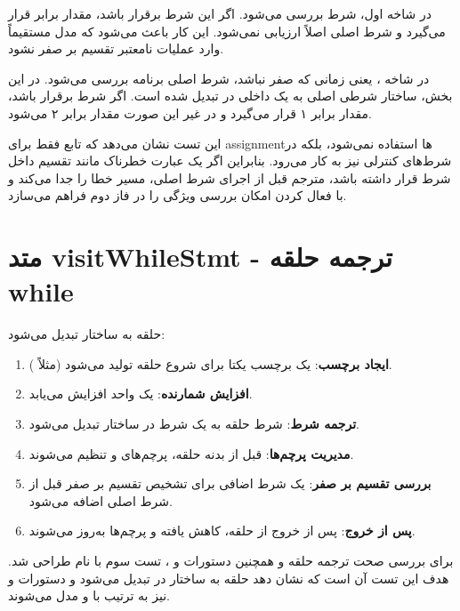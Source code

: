 \documentclass[12pt]{report}
\begin{document}
	در شاخه اول، شرط  بررسی می‌شود. 
	اگر این شرط برقرار باشد، مقدار  برابر  قرار می‌گیرد و شرط اصلی  اصلاً ارزیابی نمی‌شود. 
	این کار باعث می‌شود که مدل مستقیماً وارد عملیات نامعتبر تقسیم بر صفر نشود.
	
	در شاخه ، یعنی زمانی که  صفر نباشد، شرط اصلی برنامه بررسی می‌شود. 
	در این بخش، ساختار شرطی اصلی  به یک  داخلی در  تبدیل شده است. 
	اگر شرط  برقرار باشد، مقدار  برابر ۱ قرار می‌گیرد و در غیر این صورت مقدار  برابر ۲ می‌شود.
	
	این تست نشان می‌دهد که تابع  فقط برای assignmentها استفاده نمی‌شود، بلکه در شرط‌های کنترلی نیز به کار می‌رود. 
	بنابراین اگر یک عبارت خطرناک مانند تقسیم داخل شرط  قرار داشته باشد، مترجم قبل از اجرای شرط اصلی، مسیر خطا را جدا می‌کند و با فعال کردن  امکان بررسی ویژگی  را در فاز دوم فراهم می‌سازد.
	
	\section{متد visitWhileStmt - ترجمه حلقه while}
	
	حلقه  به ساختار  تبدیل می‌شود:
	
	\begin{enumerate}
		\item \textbf{ایجاد برچسب}: یک برچسب یکتا برای شروع حلقه تولید می‌شود (مثلاً ).
		\item \textbf{افزایش شمارنده}:  یک واحد افزایش می‌یابد.
		\item \textbf{ترجمه شرط}: شرط حلقه به یک شرط در ساختار  تبدیل می‌شود.
		\item \textbf{مدیریت پرچم‌ها}: قبل از بدنه حلقه، پرچم‌های  و  تنظیم می‌شوند.
		\item \textbf{بررسی تقسیم بر صفر}: یک شرط اضافی برای تشخیص تقسیم بر صفر قبل از شرط اصلی اضافه می‌شود.
		\item \textbf{پس از خروج}: پس از خروج از حلقه،  کاهش یافته و پرچم‌ها به‌روز می‌شوند.
	\end{enumerate}
	
	برای بررسی صحت ترجمه حلقه  و همچنین دستورات  و ، تست سوم  با نام طراحی شد. 
	هدف این تست آن است که نشان دهد حلقه  به ساختار  در  تبدیل می‌شود و دستورات  و  نیز به ترتیب با  و  مدل می‌شوند.
	
\end{document}
